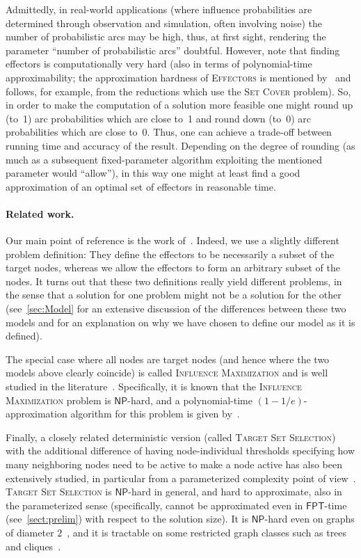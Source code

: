 \documentclass{article}
\newcommand{\np}{{\mathsf{NP}}}
\newcommand{\fpt}{{\mathsf{FPT}}}
\newcommand{\probSetCover}{\textsc{Set Cover}\xspace}
\newcommand{\probEffectors}{\textsc{Effectors}\xspace}
\begin{document}
Admittedly, in real-world applications (where influence probabilities
are determined through observation and simulation, often involving noise) 
the number of probabilistic arcs may be high, thus, at first sight,
rendering the parameter ``number of probabilistic arcs'' doubtful.
However, note that finding effectors is computationally very hard
(also in terms of polynomial-time approximability; the approximation hardness of \probEffectors 
is mentioned by~\citet{LTGMH10} and follows, for example, from the reductions which use the \probSetCover problem).
So, in order to make the computation of a solution more feasible one might 
round up (to~1) arc probabilities which are close to~1 and round down (to~0) arc
probabilities which are close to~0. Thus, one can achieve a trade-off between running time and accuracy of the result.
Depending on the degree of rounding 
(as much as a subsequent fixed-parameter algorithm exploiting 
the mentioned parameter would ``allow''),
in this way one might at least find
a good approximation of an optimal set of effectors in reasonable time.


\paragraph{Related work.}
Our main point of reference is the work of~\citet{LTGMH10}.
Indeed, we use a slightly different problem definition:
They define the effectors to be necessarily a subset of the target nodes, 
whereas we allow the effectors to form an arbitrary
subset of the nodes. It turns out that these two definitions really
yield different problems, in the sense that a solution for one problem might not be a solution for the other
(see~\autoref{sec:Model} for an extensive discussion of the differences between these two models
and for an explanation on why we have chosen to define our model as it is defined).


The special case where all nodes are target nodes 
(and hence where the two models above clearly coincide) is
called \textsc{Influence Maximization} and is well studied in the
literature~\cite{BSKDSM07, DPRM01, KKT15}.
Specifically,
it is known that the \textsc{Influence Maximization} problem is $\np$-hard,
and a polynomial-time $(1 - 1 / e)$-approximation algorithm for this problem is given by~\citet{KKT15}.


Finally, a closely related deterministic version (called
\textsc{Target Set Selection}) with the 
additional difference of having node-individual 
thresholds specifying how many neighboring nodes need to be active 
to make a node active has also been extensively studied,
in particular from a parameterized complexity point of 
view~\cite{BCNS14-comp,BCNS14-jda,Ben-ZwiHLN11,CNNW14,NNUW13}.
\textsc{Target Set Selection} is $\np$-hard in general,
and hard to approximate, also in the parameterized sense
(specifically,
cannot be approximated even in $\fpt$-time (see~\autoref{sect:prelim}) with respect to the solution size).
It is $\np$-hard even on graphs of diameter $2$~\cite{NNUW13},
and it is tractable on some restricted graph classes such as trees~\cite{Ben-ZwiHLN11} and cliques~\cite{NNUW13}.
\end{document}
